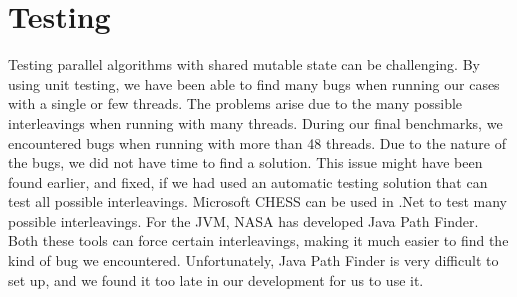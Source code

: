 \section{Testing}
\label{sec:testing}
Testing parallel algorithms with shared mutable state can be challenging. By
using unit testing, we have been able to find many bugs when running our
cases with a single or few threads. The problems arise due to the many possible
interleavings when running with many threads. During our final benchmarks, we
encountered bugs when running with more than 48 threads. Due to the nature of
the bugs, we did not have time to find a solution. This issue might have been
found earlier, and fixed, if we had used an automatic testing solution that can
test all possible interleavings. Microsoft CHESS can be used in .Net
to test many possible interleavings. For the JVM, NASA has developed Java Path
Finder. Both these tools can force certain interleavings, making it much easier
to find the kind of bug we encountered. Unfortunately, Java Path Finder is very
difficult to set up, and we found it too late in our development for us to use
it.
